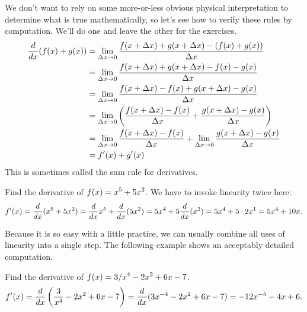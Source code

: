 We don't want to rely on some more-or-less obvious physical
interpretation to determine what is true mathematically, so let's see
how to verify these rules by computation. We'll do one and leave the
other for the exercises.
\begin{align*}
{d\over dx}(f(x)+g(x)) &= \lim_{\Delta x\to 0} {f(x+\Delta
  x)+g(x+\Delta x) - (f(x)+g(x))\over \Delta x}  \\
&= \lim_{\Delta x\to 0} {f(x+\Delta
  x)+g(x+\Delta x) - f(x)-g(x)\over \Delta x}  \\
&= \lim_{\Delta x\to 0} {f(x+\Delta
  x)-f(x) +g(x+\Delta x) -g(x)\over \Delta x}  \\
&= \lim_{\Delta x\to 0} \left({f(x+\Delta
  x)-f(x)\over \Delta x}  +{g(x+\Delta x) -g(x)\over \Delta x}\right)  \\
&= \lim_{\Delta x\to 0} {f(x+\Delta
  x)-f(x)\over \Delta x}  +
\lim_{\Delta x\to 0} {g(x+\Delta x) -g(x)\over \Delta x}  \\
&=f'(x)+g'(x) \\
\end{align*}
This is sometimes called the {\dfont sum rule} for derivatives.
\begin{example}
Find the derivative of $\displaystyle f(x)=x^5+5x^2$. We have to invoke linearity
twice here: 
$$f'(x) = {d\over dx}(x^5+5x^2) = {d\over dx}x^5 + {d\over dx}(5x^2) =
5x^4+5{d\over dx}(x^2) = 5x^4+5\cdot 2x^1 = 5x^4+10x.$$
\vskip-10pt\end{example}

Because it is so easy with a little practice, we can usually combine
all uses of linearity into a single step. The following example shows
an acceptably detailed computation.

\begin{example}
Find the derivative of $\displaystyle f(x)=3/x^4-2x^2+6x-7$.
$$f'(x) = {d\over dx}\left( {3\over x^4}-2x^2+6x-7\right)
= {d\over dx}(3x^{-4}-2x^2+6x-7) 
= -12x^{-5}-4x+6.$$
\vskip-10pt\end{example}

